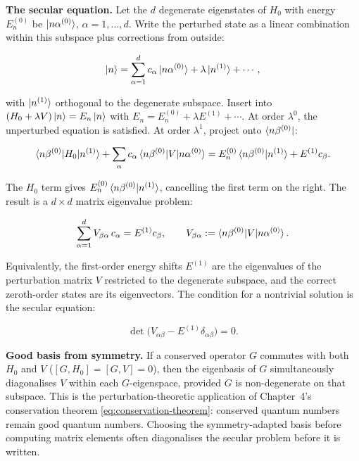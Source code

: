 \medskip\noindent\textbf{The secular equation.}
Let the $d$ degenerate eigenstates of $H_{0}$ with energy $E_{n}^{(0)}$ be $\ket{n\alpha^{(0)}}$, $\alpha = 1,\ldots,d$. Write the perturbed state as a linear combination within this subspace plus corrections from outside:
\begin{linenomath}
\begin{equation*}
\ket{n} = \sum_{\alpha=1}^{d} c_{\alpha}\ket{n\alpha^{(0)}} + \lambda\ket{n^{(1)}} + \cdots,
\end{equation*}
\end{linenomath}
with $\ket{n^{(1)}}$ orthogonal to the degenerate subspace. Insert into $(H_{0}+\lambda V)\ket{n}=E_{n}\ket{n}$ with $E_{n}=E_{n}^{(0)}+\lambda E^{(1)}+\cdots$. At order $\lambda^{0}$, the unperturbed equation is satisfied. At order $\lambda^{1}$, project onto $\bra{n\beta^{(0)}}$:
\begin{linenomath}
\begin{equation*}
\braket{n\beta^{(0)}|H_{0}|n^{(1)}} + \sum_{\alpha} c_{\alpha}\braket{n\beta^{(0)}|V|n\alpha^{(0)}} = E_{n}^{(0)}\braket{n\beta^{(0)}|n^{(1)}} + E^{(1)}c_{\beta}.
\end{equation*}
\end{linenomath}
The $H_{0}$ term gives $E_{n}^{(0)}\braket{n\beta^{(0)}|n^{(1)}}$, cancelling the first term on the right. The result is a $d\times d$ matrix eigenvalue problem:
\begin{linenomath}
\begin{equation*}
\sum_{\alpha=1}^{d} V_{\beta\alpha}\,c_{\alpha} = E^{(1)}c_{\beta},
\qquad
V_{\beta\alpha} := \braket{n\beta^{(0)}|V|n\alpha^{(0)}}.
\end{equation*}
\end{linenomath}
Equivalently, the first-order energy shifts $E^{(1)}$ are the eigenvalues of the perturbation matrix $V$ restricted to the degenerate subspace, and the correct zeroth-order states are its eigenvectors. The condition for a nontrivial solution is the secular equation:
\begin{linenomath}
\begin{equation}
\det\!\bigl(V_{\alpha\beta} - E^{(1)}\delta_{\alpha\beta}\bigr) = 0.
\label{eq:secular-equation}
\end{equation}
\end{linenomath}

\medskip\noindent\textbf{Good basis from symmetry.}
If a conserved operator $G$ commutes with both $H_{0}$ and $V$ ($[G,H_{0}]=[G,V]=0$), then the eigenbasis of $G$ simultaneously diagonalises $V$ within each $G$-eigenspace, provided $G$ is non-degenerate on that subspace. This is the perturbation-theoretic application of Chapter~4's conservation theorem \eqref{eq:conservation-theorem}: conserved quantum numbers remain good quantum numbers. Choosing the symmetry-adapted basis before computing matrix elements often diagonalises the secular problem before it is written.

